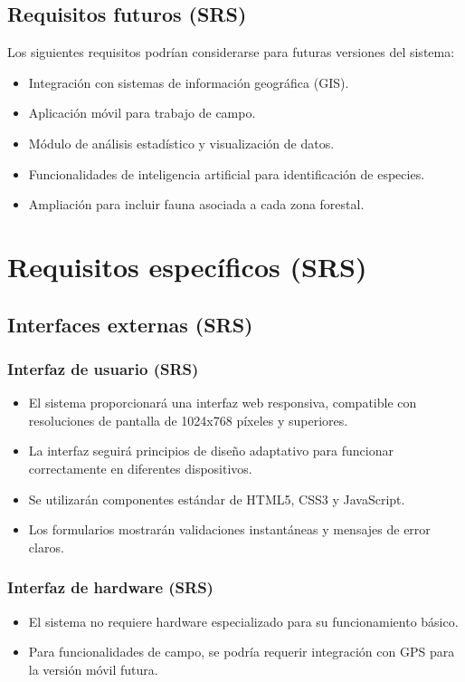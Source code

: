 \subsection{Requisitos futuros (SRS)}
\label{srs:futuros}
Los siguientes requisitos podrían considerarse para futuras versiones del sistema:
\begin{itemize}
\item Integración con sistemas de información geográfica (GIS).
\item Aplicación móvil para trabajo de campo.
\item Módulo de análisis estadístico y visualización de datos.
\item Funcionalidades de inteligencia artificial para identificación de especies.
\item Ampliación para incluir fauna asociada a cada zona forestal.
\end{itemize}

\section{Requisitos específicos (SRS)}
\label{srs:requisitos}

\subsection{Interfaces externas (SRS)}
\label{srs:interfaces}

\subsubsection{Interfaz de usuario (SRS)}
\begin{itemize}
\item El sistema proporcionará una interfaz web responsiva, compatible con resoluciones de pantalla de 1024x768 píxeles y superiores.
\item La interfaz seguirá principios de diseño adaptativo para funcionar correctamente en diferentes dispositivos.
\item Se utilizarán componentes estándar de HTML5, CSS3 y JavaScript.
\item Los formularios mostrarán validaciones instantáneas y mensajes de error claros.
\end{itemize}

\subsubsection{Interfaz de hardware (SRS)}
\begin{itemize}
\item El sistema no requiere hardware especializado para su funcionamiento básico.
\item Para funcionalidades de campo, se podría requerir integración con GPS para la versión móvil futura.
\end{itemize}

